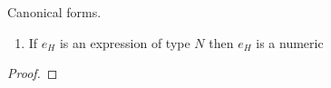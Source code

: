 \begin{hcf}
\label{hcf}
Canonical forms.
\begin{enumerate}
\item If $e_{H}$ is an expression of type $N$ then $e_{H}$ is a numeric
\end{enumerate}
\begin{proof}

\end{proof}
\end{hcf}